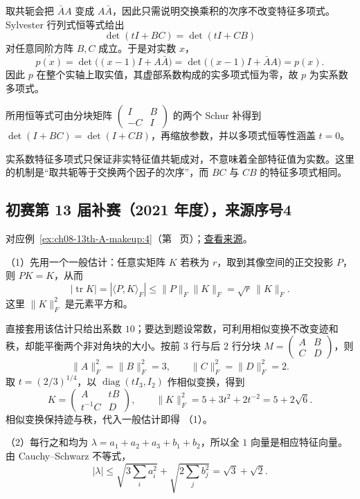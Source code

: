 \documentclass[UTF8,12pt,a4paper,fontset=fandol]{ctexart}
\begin{document}
\begin{solve}

取共轭会把 $\bar A A$ 变成 $A\bar A$，因此只需说明交换乘积的次序不改变特征多项式。Sylvester 行列式恒等式给出
\[
\det(tI+BC)=\det(tI+CB)
\]
对任意同阶方阵 $B,C$ 成立。于是对实数 $x$，
\[
\overline{p(x)}
=\det\bigl((x-1)I+A\bar A\bigr)
=\det\bigl((x-1)I+\bar A A\bigr)=p(x).
\]
因此 $p$ 在整个实轴上取实值，其虚部系数构成的实多项式恒为零，故 $p$ 为实系数多项式。

所用恒等式可由分块矩阵 $\begin{pmatrix}I&B\\-C&I\end{pmatrix}$ 的两个 Schur 补得到 $\det(I+BC)=\det(I+CB)$，再缩放参数，并以多项式恒等性涵盖 $t=0$。

\end{solve}

\begin{remark}[方法与条件]

实系数特征多项式只保证非实特征值共轭成对，不意味着全部特征值为实数。这里的机制是“取共轭等于交换两个因子的次序”，而 $BC$ 与 $CB$ 的特征多项式相同。

\end{remark}

\subsection{初赛第 13 届补赛（2021 年度），来源序号4}\label{ans:ch08-13th-A-makeup:4}\label{pr:ch08-13th-A-makeup:4}

对应例~\ref{ex:ch08-13th-A-makeup:4}（第~\pageref{ex:ch08-13th-A-makeup:4} 页）；\href{https://github.com/lzxcr/cmc-mathematics/blob/64916fa1fdbc3e444a652eca204d5669058ee321/src/problems/preliminary/13-makeup/04.md}{查看来源}。

\begin{solve}

（1）先用一个一般估计：任意实矩阵 $K$ 若秩为 $r$，取到其像空间的正交投影 $P$，则 $PK=K$，从而
\[
|\operatorname{tr}K|=|\langle P,K\rangle_F|
\leq\|P\|_F\|K\|_F=\sqrt r\,\|K\|_F.
\]
这里 $\|K\|_F^2$ 是元素平方和。

直接套用该估计只给出系数 $10$；要达到题设常数，可利用相似变换不改变迹和秩，却能平衡两个非对角块的大小。按前 $3$ 行与后 $2$ 行分块 $M=\begin{pmatrix}A&B\\C&D\end{pmatrix}$，则
\[
\|A\|_F^2=\|B\|_F^2=3,\qquad
\|C\|_F^2=\|D\|_F^2=2.
\]
取 $t=(2/3)^{1/4}$，以 $\operatorname{diag}(tI_3,I_2)$ 作相似变换，得到
\[
K=\begin{pmatrix}A&tB\\t^{-1}C&D\end{pmatrix},
\qquad \|K\|_F^2=5+3t^2+2t^{-2}=5+2\sqrt6.
\]
相似变换保持迹与秩，代入一般估计即得 （1）。

（2）每行之和均为 $\lambda=a_1+a_2+a_3+b_1+b_2$，所以全 $1$ 向量是相应特征向量。由 Cauchy--Schwarz 不等式，
\[
|\lambda|\leq\sqrt{3\sum_i a_i^2}+\sqrt{2\sum_j b_j^2}
=\sqrt3+\sqrt2.
\]

\end{solve}
\end{document}
